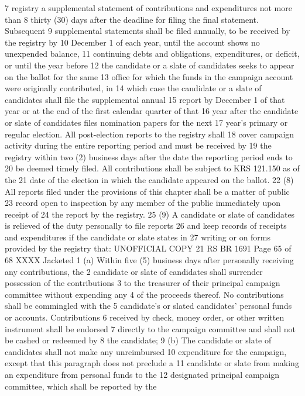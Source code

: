 7 registry a supplemental statement of contributions and expenditures not more than
8 thirty (30) days after the deadline for filing the final statement. Subsequent
9 supplemental statements shall be filed annually, to be received by the registry by
10 December 1 of each year, until the account shows no unexpended balance,
11 continuing debts and obligations, expenditures, or deficit, or until the year before
12 the candidate or a slate of candidates seeks to appear on the ballot for the same
13 office for which the funds in the campaign account were originally contributed, in
14 which case the candidate or a slate of candidates shall file the supplemental annual
15 report by December 1 of that year or at the end of the first calendar quarter of that
16 year after the candidate or slate of candidates files nomination papers for the next
17 year's primary or regular election. All post-election reports to the registry shall
18 cover campaign activity during the entire reporting period and must be received by
19 the registry within two (2) business days after the date the reporting period ends to
20 be deemed timely filed. All contributions shall be subject to KRS 121.150 as of the
21 date of the election in which the candidate appeared on the ballot.
22 (8) All reports filed under the provisions of this chapter shall be a matter of public
23 record open to inspection by any member of the public immediately upon receipt of
24 the report by the registry.
25 (9) A candidate or slate of candidates is relieved of the duty personally to file reports
26 and keep records of receipts and expenditures if the candidate or slate states in
27 writing or on forms provided by the registry that:
UNOFFICIAL COPY 21 RS BR 1691
Page 65 of 68
XXXX Jacketed
1 (a) Within five (5) business days after personally receiving any contributions, the
2 candidate or slate of candidates shall surrender possession of the contributions
3 to the treasurer of their principal campaign committee without expending any
4 of the proceeds thereof. No contributions shall be commingled with the
5 candidate's or slated candidates' personal funds or accounts. Contributions
6 received by check, money order, or other written instrument shall be endorsed
7 directly to the campaign committee and shall not be cashed or redeemed by
8 the candidate;
9 (b) The candidate or slate of candidates shall not make any unreimbursed
10 expenditure for the campaign, except that this paragraph does not preclude a
11 candidate or slate from making an expenditure from personal funds to the
12 designated principal campaign committee, which shall be reported by the
